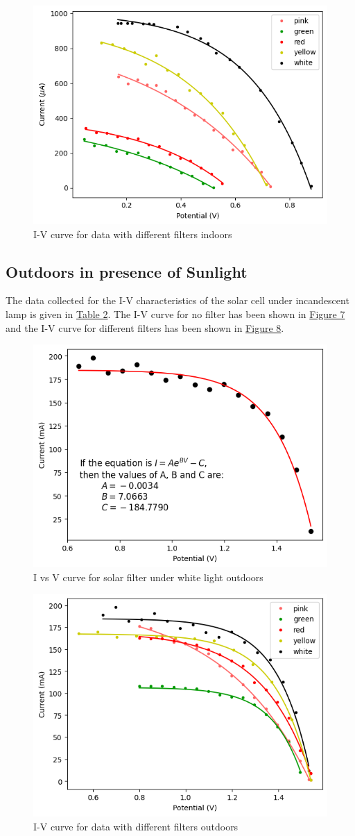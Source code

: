 		\begin{figure}[H]
			\centering
			\includegraphics[width=0.75\columnwidth]{images/graph_2.png}
			\caption{I-V curve for data with different filters indoors}
			\label{graph:2}
		\end{figure}

	\subsection{Outdoors in presence of Sunlight}
		

		The data collected for the I-V characteristics of the solar cell under incandescent lamp is given in \hyperref[tab:outdoor]{Table 2}. The I-V curve for no filter has been shown in \hyperref[graph:3]{Figure 7} and the I-V curve for different filters has been shown in \hyperref[graph:4]{Figure 8}.

		\begin{figure}[h]
			\centering
			\includegraphics[width=0.75\columnwidth]{images/graph_3.png}
			\caption{I vs V curve for solar filter under white light outdoors}
			\label{graph:3}
		\end{figure}

		\begin{figure}[h]
			\centering
			\includegraphics[width=0.75\columnwidth]{images/graph_4.png}
			\caption{I-V curve for data with different filters outdoors}
			\label{graph:4}
		\end{figure}
